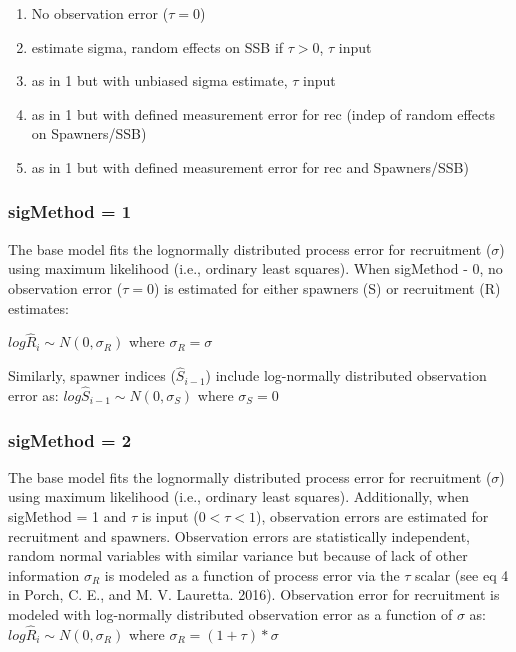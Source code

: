 \documentclass[
]{article}
\providecommand{\tightlist}{%
  \setlength{\itemsep}{0pt}\setlength{\parskip}{0pt}}
\begin{document}
\begin{enumerate}
\def\labelenumi{\arabic{enumi}.}
\tightlist
\item
  No observation error (\(\tau=0\))
\item
  estimate sigma, random effects on SSB if \(\tau>0\), \(\tau\) input
\item
  as in 1 but with unbiased sigma estimate, \(\tau\) input
\item
  as in 1 but with defined measurement error for rec (indep of random
  effects on Spawners/SSB)
\item
  as in 1 but with defined measurement error for rec and Spawners/SSB)
\end{enumerate}

\hypertarget{sigmethod-1}{%
\subsubsection{sigMethod = 1}\label{sigmethod-1}}

The base model fits the lognormally distributed process error for
recruitment (\(\sigma\)) using maximum likelihood (i.e., ordinary least
squares). When sigMethod - 0, no observation error (\(\tau = 0\)) is
estimated for either spawners (S) or recruitment (R) estimates:

\(log\hat{R}_i\sim N(0,\sigma_R)\) where \(\sigma_R=\sigma\)

Similarly, spawner indices (\(\hat{S}_{i-1}\)) include log-normally
distributed observation error as:
\(log\hat{S}_{i-1} \sim N(0,\sigma_S)\) where \(\sigma_S=0\)

\hypertarget{sigmethod-2}{%
\subsubsection{sigMethod = 2}\label{sigmethod-2}}

The base model fits the lognormally distributed process error for
recruitment (\(\sigma\)) using maximum likelihood (i.e., ordinary least
squares). Additionally, when sigMethod = 1 and \(\tau\) is input
(\(0<\tau<1\)), observation errors are estimated for recruitment and
spawners. Observation errors are statistically independent, random
normal variables with similar variance but because of lack of other
information \(\sigma_R\) is modeled as a function of process error via
the \(\tau\) scalar (see eq 4 in Porch, C. E., and M. V. Lauretta.
2016). Observation error for recruitment is modeled with log-normally
distributed observation error as a function of \(\sigma\) as:
\(log\hat{R}_i\sim N(0,\sigma_R)\) where \(\sigma_R=(1+\tau)*\sigma\)
\end{document}
